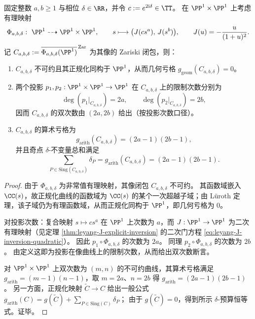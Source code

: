 \begin{theorem}\label{thm:leyang-lissajous-bidegree-singularity-budget}
固定整数 \(a,b\ge 1\) 与相位 \(\delta\in\RR\)，并令 \(c:=e^{2\mathrm{i}\delta}\in\TT\)。
在 \(\PP^1\times\PP^1\) 上考虑有理映射
\[
\Phi_{a,b,\delta}:\ \PP^1\dashrightarrow \PP^1\times\PP^1,\qquad
s\longmapsto\bigl(J(c s^{a}),\,J(s^{b})\bigr),
\qquad
J(u)=-\frac{u}{(1+u)^2}.
\]
记 \(C_{a,b,\delta}:=\overline{\Phi_{a,b,\delta}(\PP^1)}^{\,\mathrm{Zar}}\) 为其像的 Zariski 闭包，则：
\begin{enumerate}
  \item \(C_{a,b,\delta}\) 不可约且其正规化同构于 \(\PP^1\)，从而几何亏格 \(g_{\mathrm{geom}}(C_{a,b,\delta})=0\)。
  \item 两个投影 \(p_1,p_2:\PP^1\times\PP^1\to\PP^1\) 在 \(C_{a,b,\delta}\) 上的限制次数分别为
        \[
        \deg(p_1|_{C_{a,b,\delta}})=2a,\qquad \deg(p_2|_{C_{a,b,\delta}})=2b,
        \]
        因而 \(C_{a,b,\delta}\) 的双次数由 \((2a,2b)\) 给出（按投影次数口径）。
  \item \(C_{a,b,\delta}\) 的算术亏格为
        \[
        g_{\mathrm{arith}}(C_{a,b,\delta})=(2a-1)(2b-1),
        \]
        并且奇点 \(\delta\)-不变量总和满足
        \[
        \sum_{P\in\mathrm{Sing}(C_{a,b,\delta})}\delta_P=g_{\mathrm{arith}}(C_{a,b,\delta})=(2a-1)(2b-1).
        \]
\end{enumerate}
\end{theorem}
\begin{proof}
由于 \(\Phi_{a,b,\delta}\) 为非常值有理映射，其像闭包 \(C_{a,b,\delta}\) 不可约。
其函数域嵌入 \(\CC(s)\)，故正规化曲线的函数域为 \(\CC(s)\) 的某个一次超越子域；由 Lüroth 定理，该子域仍为有理函数域，从而正规化同构于 \(\PP^1\)，即几何亏格为 \(0\)。
\par
对投影次数：复合映射
\(
s\mapsto c s^{a}
\)
在 \(\PP^1\) 上次数为 \(a\)，而 \(J:\PP^1\to\PP^1\) 为二次有理映射（见定理 \ref{thm:leyang-J-explicit-inversion} 的二次门方程 \eqref{eq:leyang-J-inversion-quadratic}）。
因此 \(p_1\circ\Phi_{a,b,\delta}\) 的次数为 \(2a\)。
同理 \(p_2\circ\Phi_{a,b,\delta}\) 的次数为 \(2b\)。
由定义这即为投影在像曲线上的限制次数，从而给出双次数断言。
\par
对 \(\PP^1\times\PP^1\) 上双次数为 \((m,n)\) 的不可约曲线，其算术亏格满足 \(g_{\mathrm{arith}}=(m-1)(n-1)\)，取 \(m=2a\)、\(n=2b\) 得
\(
g_{\mathrm{arith}}=(2a-1)(2b-1)
\)。
另一方面，正规化映射 \(\widetilde C\to C\) 给出一般公式
\(
g_{\mathrm{arith}}(C)=g(\widetilde C)+\sum_{P\in\mathrm{Sing}(C)}\delta_P
\)；
由于 \(g(\widetilde C)=0\)，得到所示 \(\delta\)-预算恒等式。证毕。
\end{proof}


\endinput

